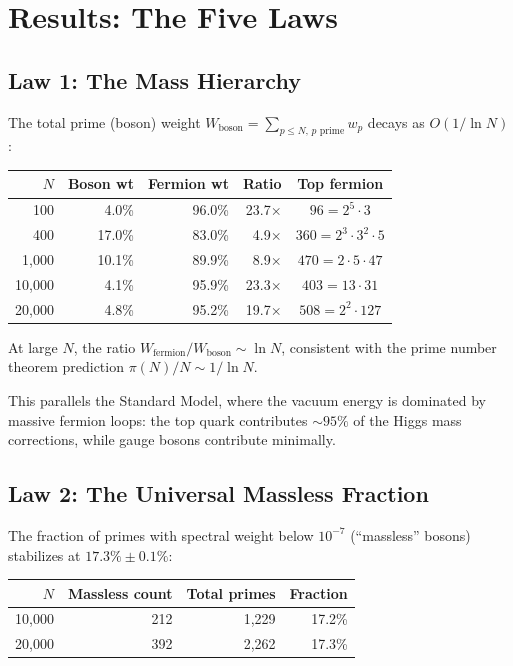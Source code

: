 \documentclass[11pt,a4paper]{article}
\begin{document}
\section{Results: The Five Laws}
\label{sec:results}

\subsection{Law 1: The Mass Hierarchy}

\begin{observation}
\label{obs:decay}
The total prime (boson) weight
$W_{\text{boson}} = \sum_{p \leq N,\, p\text{ prime}} w_p$
decays as $O(1/\ln N)$:
\begin{center}
\begin{tabular}{@{}rrrrc@{}}
\toprule
$N$ & Boson wt & Fermion wt & Ratio & Top fermion \\
\midrule
100     & 4.0\%  & 96.0\% & 23.7$\times$ & $96 = 2^5 \cdot 3$ \\
400     & 17.0\% & 83.0\% & 4.9$\times$  & $360 = 2^3 \cdot 3^2 \cdot 5$ \\
1{,}000    & 10.1\% & 89.9\% & 8.9$\times$  & $470 = 2 \cdot 5 \cdot 47$ \\
10{,}000   & 4.1\%  & 95.9\% & 23.3$\times$ & $403 = 13 \cdot 31$ \\
20{,}000   & 4.8\%  & 95.2\% & 19.7$\times$ & $508 = 2^2 \cdot 127$ \\
\bottomrule
\end{tabular}
\end{center}
At large $N$, the ratio $W_{\text{fermion}} / W_{\text{boson}} \sim \ln N$,
consistent with the prime number theorem prediction
$\pi(N)/N \sim 1/\ln N$.
\end{observation}

This parallels the Standard Model, where the vacuum energy is dominated
by massive fermion loops: the top quark contributes ${\sim}95\%$ of the
Higgs mass corrections, while gauge bosons contribute minimally.

\subsection{Law 2: The Universal Massless Fraction}

\begin{observation}
\label{obs:massless}
The fraction of primes with spectral weight below $10^{-7}$
(``massless'' bosons) stabilizes at $17.3\% \pm 0.1\%$:
\begin{center}
\begin{tabular}{@{}rrrr@{}}
\toprule
$N$ & Massless count & Total primes & Fraction \\
\midrule
10{,}000 & 212  & 1{,}229  & 17.2\% \\
20{,}000 & 392  & 2{,}262  & 17.3\% \\
\bottomrule
\end{tabular}
\end{center}
\end{observation}
\end{document}
